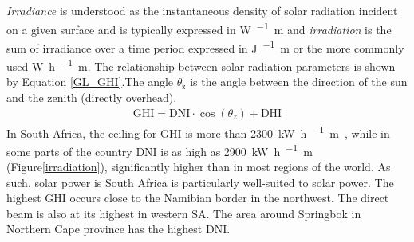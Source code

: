 \emph{Irradiance} is understood as the instantaneous density of solar radiation incident on a given surface and is typically expressed in \si{\watt\per\squared\metre} and \emph{irradiation} is the sum of irradiance over a time period expressed in \si{\joule\per\squared\metre} or the more commonly used \si{\watt\hour\per\squared\metre}. The relationship between solar radiation parameters is shown by Equation \ref{GL_GHI}.The angle $\theta_\text{z}$ is the angle between the direction of the sun and the zenith (directly overhead).
\begin{align}
\text{GHI}=\text{DNI}\cdot\cos(\theta_{z})+\text{DHI}\label{GL_GHI}
\end{align}
In South Africa, the ceiling for GHI is more than \SI{2300}{\kilo\watt\hour\per\squared\metre\year}, while in some parts of the country DNI is as high as \SI{2900}{\kilo\watt\hour\per\squared\metre\year} (Figure\ref{irradiation}), significantly higher than in most regions of the world. As such, solar power is South Africa is particularly well-suited to solar power. The highest GHI occurs close to the Namibian border in the northwest. The direct beam is also at its highest in western SA. The area around Springbok in Northern Cape province has the highest DNI.

